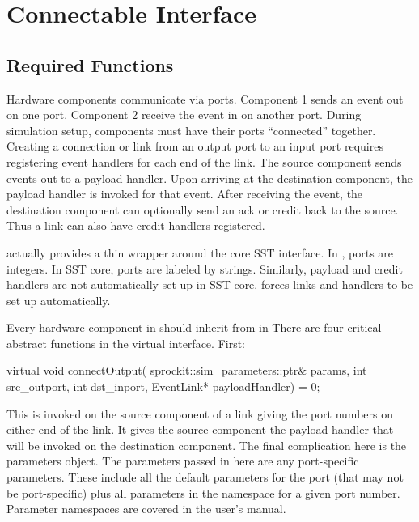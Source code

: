 
\chapter{\sstmacro Connectable Interface}\label{chapter:Connectables}

\section{Required Functions}

Hardware components communicate via ports. Component 1 sends an event out on one port.
Component 2 receive the event in on another port.
During simulation setup, components must have their ports ``connected'' together.
Creating a connection or link from an output port to an input port requires registering event handlers for each end of the link.
The source component sends events out to a payload handler. 
Upon arriving at the destination component, the payload handler is invoked for that event.
After receiving the event, the destination component can optionally send an ack or credit back to the source.
Thus a link can also have credit handlers registered.

\sstmacro actually provides a thin wrapper around the core SST interface.
In \sstmacro, ports are integers.
In SST core, ports are labeled by strings.
Similarly, payload and credit handlers are not automatically set up in SST core.
\sstmacro forces links and handlers to be set up automatically.

Every hardware component in \sstmacro should inherit from  in 
There are four critical abstract functions in the virtual interface. First:

\begin{CppCode}
  virtual void connectOutput(
    sprockit::sim_parameters::ptr& params,
    int src_outport,
    int dst_inport,
    EventLink* payloadHandler) = 0;
\end{CppCode}
This is invoked on the source component of a link giving the port numbers on either end of the link.
It gives the source component the payload handler that will be invoked on the destination component.
The final complication here is the parameters object.
The parameters passed in here are any port-specific parameters.
These include all the default parameters for the port (that may not be port-specific)
plus all parameters in the namespace  for a given port number.
Parameter namespaces are covered in the user's manual.

